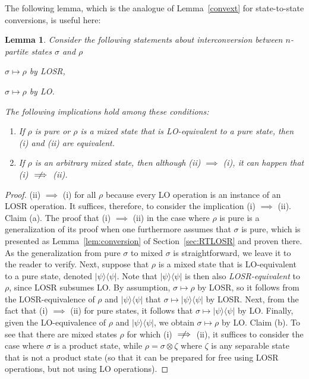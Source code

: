 \documentclass[prx,11pt,letterpaper,twocolumn,accepted=2023-11-27]{quantumarticle}
\theoremstyle{plain}
\newtheorem{lem}[theo]{Lemma}
\theoremstyle{definition}
\newcommand{\nimplies}{\centernot{\implies}}
\begin{document}
The following lemma, which is the analogue of Lemma~\ref{convext} for state-to-state conversions, is useful here:
 \begin{samepage}
\begin{lem}
    \label{lem:conversion3}
    Consider the following statements about interconversion between $n$-partite states $\sigma$ and $\rho$
    \begin{compactenum}[(i)]
        \item  $\sigma \mapsto \rho $ by LOSR,
        \item  $\sigma \mapsto \rho $ by LO.
    \end{compactenum}
The following implications hold among these conditions:
 \begin{enumerate}
 \item[(a)] If $\rho$ is pure or $\rho$ is a mixed state that is LO-equivalent to a pure state, then  (i) and (ii) are equivalent.
\item[(b)] If $\rho$ is an arbitrary mixed state, then although (ii) $\implies$ (i), it can happen that (i) $\nimplies$ (ii).
 \end{enumerate} 
\end{lem}
\end{samepage}

\begin{proof}  (ii) $\implies$ (i) for all $\rho$ because every LO operation is an instance of an LOSR operation. It suffices, therefore, to consider the implication (i) $\implies$ (ii).  Claim (a).  The proof that (i) $\implies$ (ii) in the case where $\rho$ is pure is a generalization of its proof when one furthermore assumes that $\sigma$ is pure, which is  presented as Lemma~\ref{lem:conversion} of Section~\ref{sec:RTLOSR} and proven there.  As the generalization from pure $\sigma$ to mixed $\sigma$ is straightforward, we leave it to the reader to verify.  Next, suppose that $\rho$ is a mixed state that is LO-equivalent to a pure state, denoted $|\psi\rangle\langle \psi|$.  Note that $|\psi\rangle\langle \psi|$ is then also {\em LOSR-equivalent} to $\rho$, since LOSR subsumes LO.  By assumption, $\sigma \mapsto \rho$ by LOSR, so it follows from the LOSR-equivalence of $\rho$ and $|\psi\rangle\langle \psi|$  that $\sigma \mapsto |\psi\rangle\langle \psi|$ by LOSR.  Next, from the fact that  (i) $\implies$ (ii) for pure states, it follows that $\sigma \mapsto |\psi\rangle\langle \psi|$ by LO.  Finally, given the LO-equivalence of $\rho$ and $|\psi\rangle\langle \psi|$, we obtain $\sigma \mapsto \rho$ by LO. Claim (b). To see that there are mixed states $\rho$ for which (i) $\nimplies$ (ii), it suffices to consider the case where $\sigma$ is a product state, while $\rho=\sigma \otimes \zeta$ where $\zeta$ is any separable state that is not a product state (so that it can be prepared for free using LOSR operations, but not using LO operations). 
\end{proof}
\end{document}
